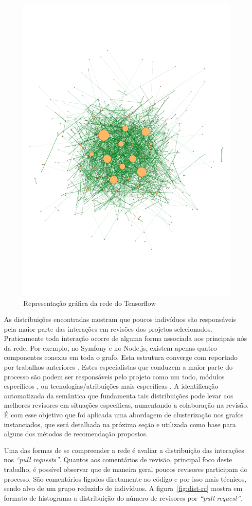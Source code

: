\documentclass[12pt,openany,oneside,a4paper,english,brazil]{abntbibufjf}
\begin{document}
  \begin{figure}[tbp]
  \centerline{\includegraphics[width=.6\linewidth]{graph-tensorflow}}
  \caption{Representação gráfica da rede do Tensorflow}
  \label{fig:graph-tensorflow}
  \end{figure}


  As distribuições encontradas mostram que poucos indivíduos são responsáveis pela maior parte das interações em revisões dos projetos selecionados. Praticamente toda interação ocorre de alguma forma associada aos principais nós da rede. Por exemplo, no Symfony e no Node.js, existem apenas quatro componentes conexas em toda o grafo. Esta estrutura converge com reportado por trabalhos anteriores \cite{bergquist2001}. Estes especialistas que conduzem a maior parte do processo são podem ser responsáveis pelo projeto como um todo, módulos específicos \cite{firefox2018}, ou tecnologias/atribuições mais específicas \cite{debian2018}. A identificação automatizada da semântica que fundamenta tais distribuições pode levar aos melhores revisores em situações específicas, aumentando a colaboração na revisão. É com esse objetivo que foi aplicada uma abordagem de clusterização nos grafos instanciados, que será detalhada na próxima seção e utilizada como base para alguns dos métodos de recomendação propostos.

  Uma das formas de se compreender a rede é avaliar a distribuição das interações nos \textit{``pull requests''}. Quantos aos comentários de revisão, principal foco deste trabalho, é possível observar que de maneira geral poucos revisores participam do processo. São comentários ligados diretamente ao código e por isso mais técnicos, sendo alvo de um grupo reduzido de indivíduos. A figura~\ref{fig:dist-rc} mostra em formato de histograma a distribuição do número de revisores por \textit{``pull request''}.
\end{document}
